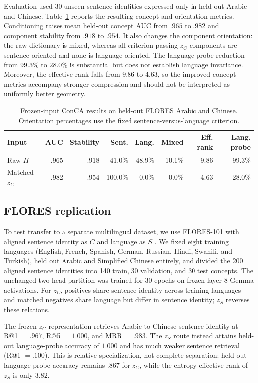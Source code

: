 \documentclass[11pt]{article}
\begin{document}
Evaluation used 30 unseen sentence identities expressed only in held-out Arabic and Chinese. Table~\ref{tab:app-conca} reports the resulting concept and orientation metrics. Conditioning raises mean held-out concept AUC from $.965$ to $.982$ and component stability from $.918$ to $.954$. It also changes the component orientation: the raw dictionary is mixed, whereas all criterion-passing $z_C$ components are sentence-oriented and none is language-oriented. The language-probe reduction from $99.3\%$ to $28.0\%$ is substantial but does not establish language invariance. Moreover, the effective rank falls from $9.86$ to $4.63$, so the improved concept metrics accompany stronger compression and should not be interpreted as uniformly better geometry.

\begin{table}[H]
\centering\scriptsize
\caption{Frozen-input ConCA results on held-out FLORES Arabic and Chinese. Orientation percentages use the fixed sentence-versus-language criterion.}
\label{tab:app-conca}
\begin{tabular*}{\columnwidth}{@{\extracolsep{\fill}}lrrrrrrr@{}}
\toprule
Input & AUC & Stability & Sent. & Lang. & Mixed & Eff. rank & Lang. probe \\
\midrule
Raw $H$ & .965 & .918 & 41.0\% & 48.9\% & 10.1\% & 9.86 & 99.3\% \\
Matched $z_C$ & .982 & .954 & 100.0\% & 0.0\% & 0.0\% & 4.63 & 28.0\% \\
\bottomrule
\end{tabular*}
\end{table}

\subsection{FLORES replication}
To test transfer to a separate multilingual dataset, we use FLORES-101 with aligned sentence identity as $C$ and language as $S$ \citep{goyal2022flores}. We fixed eight training languages (English, French, Spanish, German, Russian, Hindi, Swahili, and Turkish), held out Arabic and Simplified Chinese entirely, and divided the 200 aligned sentence identities into 140 train, 30 validation, and 30 test concepts. The unchanged two-head partition was trained for 30 epochs on frozen layer-8 Gemma activations. For $z_C$, positives share sentence identity across training languages and matched negatives share language but differ in sentence identity; $z_S$ reverses these relations.

The frozen $z_C$ representation retrieves Arabic-to-Chinese sentence identity at R@1 $=.967$, R@5 $=1.000$, and MRR $=.983$. The $z_S$ route instead attains held-out language-probe accuracy of $1.000$ and has much weaker sentence retrieval (R@1 $=.100$). This is relative specialization, not complete separation: held-out language-probe accuracy remains $.867$ for $z_C$, while the entropy effective rank of $z_S$ is only $3.82$.
\end{document}
